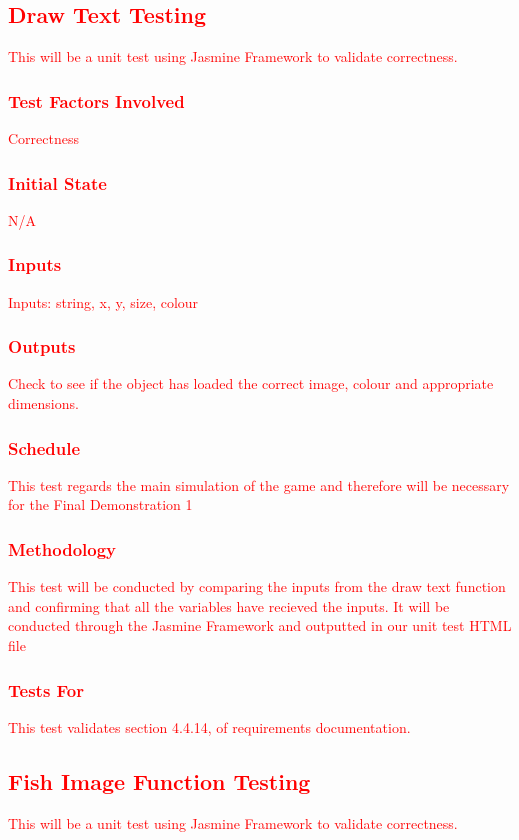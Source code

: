 \documentclass[11pt, oneside]{article}   	%
\begin{document}
\subsection{\textcolor{red}{Draw Text Testing}}
\textcolor{red}{This will be a unit test using Jasmine Framework to validate correctness.}
\subsubsection{\textcolor{red}{Test Factors Involved}}
\textcolor{red}{Correctness}
\subsubsection{\textcolor{red}{Initial State}}
\textcolor{red}{N/A}
\subsubsection{\textcolor{red}{Inputs}}
\textcolor{red}{Inputs: string, x, y, size, colour}
\subsubsection{\textcolor{red}{Outputs}}
\textcolor{red}{Check to see if the object has loaded the correct image, colour and appropriate dimensions.}
\subsubsection{\textcolor{red}{Schedule}}
\textcolor{red}{This test regards the main simulation of the game and therefore will be necessary for the Final Demonstration 1}
\subsubsection{\textcolor{red}{Methodology}}
\textcolor{red}{This test will be conducted by comparing the inputs from the draw text function and confirming that all the variables have recieved the inputs. It will be conducted through the Jasmine Framework and outputted in our unit test HTML file}
\subsubsection{\textcolor{red}{Tests For}}
\textcolor{red}{This test validates section 4.4.14, of requirements documentation.}


\subsection{\textcolor{red}{Fish Image Function Testing}}
\textcolor{red}{This will be a unit test using Jasmine Framework to validate correctness.}
\end{document}
